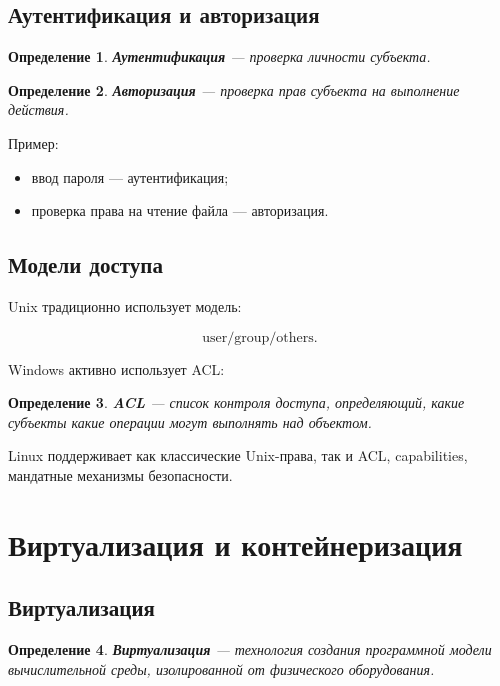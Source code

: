 \documentclass[12pt,a4paper]{article}
\newtheorem{definition}{Определение}
\begin{document}
\subsection{Аутентификация и авторизация}

\begin{definition}
\textbf{Аутентификация} --- проверка личности субъекта.
\end{definition}

\begin{definition}
\textbf{Авторизация} --- проверка прав субъекта на выполнение действия.
\end{definition}

Пример:

\begin{itemize}
    \item ввод пароля --- аутентификация;
    \item проверка права на чтение файла --- авторизация.
\end{itemize}

\subsection{Модели доступа}

Unix традиционно использует модель:

\[
\text{user/group/others}.
\]

Windows активно использует ACL:

\begin{definition}
\textbf{ACL} --- список контроля доступа, определяющий, какие субъекты какие операции могут выполнять над объектом.
\end{definition}

Linux поддерживает как классические Unix-права, так и ACL, capabilities, мандатные механизмы безопасности.

\section{Виртуализация и контейнеризация}

\subsection{Виртуализация}

\begin{definition}
\textbf{Виртуализация} --- технология создания программной модели вычислительной среды, изолированной от физического оборудования.
\end{definition}
\end{document}
